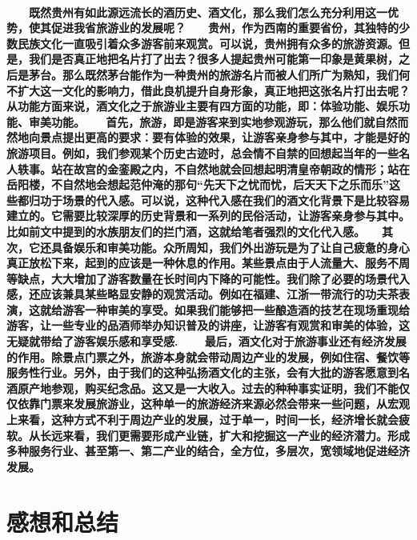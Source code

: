 \documentclass[12pt,a4paper]{ctexart} %
\begin{document}
\paragraph{\textnormal{　　既然贵州有如此源远流长的酒历史、酒文化，那么我们怎么充分利用这一优势，使其促进我省旅游业的发展呢？\newline 　　贵州，作为西南的重要省份，其独特的少数民族文化一直吸引着众多游客前来观赏。可以说，贵州拥有众多的旅游资源。但是，我们是否真正地把名片打了出去？很多人提起贵州可能第一印象是黄果树，之后是茅台。那么既然茅台能作为一种贵州的旅游名片而被人们所广为熟知，我们何不扩大这一文化的影响力，借此良机提升自身形象，真正地把这张名片打出去呢？\newline 　　 从功能方面来说，酒文化之于旅游业主要有四方面的功能，即：体验功能、娱乐功能、审美功能\cite{function}。\newline 　　 首先，旅游，即是游客来到实地参观游玩，那么他们就自然而然地向景点提出更高的要求：要有体验的效果，让游客亲身参与其中，才能是好的旅游项目。例如，我们参观某个历史古迹时，总会情不自禁的回想起当年的一些名人轶事。站在故宫的金銮殿之内，不自然地就会回想起明清皇帝朝政的情形；站在岳阳楼，不自然地会想起范仲淹的那句“先天下之忧而忧，后天天下之乐而乐”这些都归功于场景的代入感。可以说，这种代入感在我们的酒文化背景下是比较容易建立的。它需要比较深厚的历史背景和一系列的民俗活动，让游客亲身参与其中。比如前文中提到的水族朋友们的拦门酒，这就给笔者强烈的文化代入感。\newline 　　其次，它还具备娱乐和审美功能。众所周知，我们外出游玩是为了让自己疲惫的身心真正放松下来，起到的应该是一种休息的作用。某些景点由于人流量大、服务不周等缺点，大大增加了游客数量在长时间内下降的可能性。我们除了必要的场景代入感，还应该兼具某些略显安静的观赏活动。例如在福建、江浙一带流行的功夫茶表演，这就给游客一种审美的享受。如果我们能够把一些酿造酒的技艺在现场重现给游客，让一些专业的品酒师举办知识普及的讲座，让游客有观赏和审美的体验，这无疑就带给了游客娱乐感和享受感.\newline 　　 最后，酒文化对于旅游事业还有经济发展的作用。除景点门票之外，旅游本身就会带动周边产业的发展，例如住宿、餐饮等服务性行业。另外，由于我们的这种弘扬酒文化的主张，会有大批的游客愿意到名酒原产地参观，购买纪念品。这又是一大收入。过去的种种事实证明，我们不能仅仅依靠门票来发展旅游业，这种单一的旅游经济来源必然会带来一些问题，从宏观上来看，这种方式不利于周边产业的发展，过于单一，时间一长，经济增长就会疲软。从长远来看，我们更需要形成产业链，扩大和挖掘这一产业的经济潜力。形成多种服务行业、甚至第一、第二产业的结合，全方位，多层次，宽领域地促进经济发展。}}
\section{感想和总结}
\end{document}
